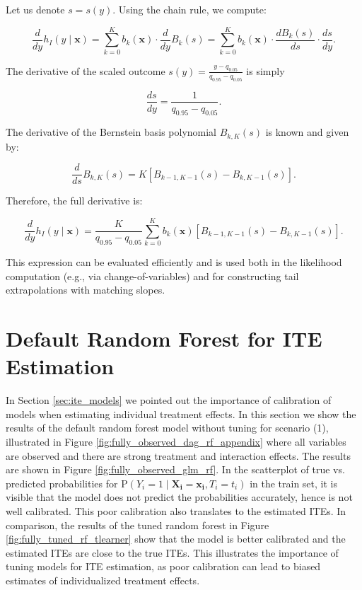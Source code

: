 Let us denote \( s = s(y) \). Using the chain rule, we compute:

\begin{equation}
\frac{d}{dy} h_I(y \mid \mathbf{x}) = \sum_{k=0}^{K} b_k(\mathbf{x}) \cdot \frac{d}{dy} B_k(s) = \sum_{k=0}^{K} b_k(\mathbf{x}) \cdot \frac{dB_k(s)}{ds} \cdot \frac{ds}{dy}.
\end{equation}

The derivative of the scaled outcome \( s(y) = \frac{y - q_{0.05}}{q_{0.95} - q_{0.05}} \) is simply

\begin{equation}
\frac{ds}{dy} = \frac{1}{q_{0.95} - q_{0.05}}.
\end{equation}

The derivative of the Bernstein basis polynomial \( B_{k,K}(s) \) is known and given by:

\begin{equation}
\frac{d}{ds} B_{k,K}(s) = K \left[ B_{k-1,K-1}(s) - B_{k,K-1}(s) \right].
\end{equation}

Therefore, the full derivative is:

\begin{equation}
\frac{d}{dy} h_I(y \mid \mathbf{x}) = \frac{K}{q_{0.95} - q_{0.05}} \sum_{k=0}^{K} b_k(\mathbf{x}) \left[ B_{k-1,K-1}(s) - B_{k,K-1}(s) \right].
\end{equation}

This expression can be evaluated efficiently and is used both in the likelihood computation (e.g., via change-of-variables) and for constructing tail extrapolations with matching slopes.


\section{Default Random Forest for ITE Estimation} \label{sec:default_rf_ite}

In Section \ref{sec:ite_models} we pointed out the importance of calibration of models when estimating individual treatment effects. In this section we show the results of the default random forest model without tuning for scenario (1), illustrated in Figure \ref{fig:fully_observed_dag_rf_appendix} where all variables are observed and there are strong treatment and interaction effects. The results are shown in Figure \ref{fig:fully_observed_glm_rf}. In the scatterplot of true vs. predicted probabilities for $\text{P}(Y_i = 1 \mid  \mathbf{X_i} = \mathbf{x_i}, T_i = t_i)$ in the train set, it is visible that the model does not predict the probabilities accurately, hence is not well calibrated. This poor calibration also translates to the estimated ITEs. In comparison, the results of the tuned random forest in Figure \ref{fig:fully_tuned_rf_tlearner} show that the model is better calibrated and the estimated ITEs are close to the true ITEs. This illustrates the importance of tuning models for ITE estimation, as poor calibration can lead to biased estimates of individualized treatment effects.


